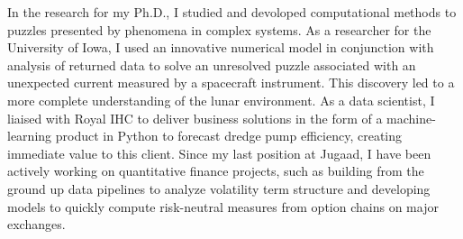 \documentclass[12pt,a4paper,sans]{moderncv} %
\begin{document}
In the research for my Ph.D., I studied and devoloped computational methods to puzzles presented by phenomena in complex systems.    
As a researcher for the University of Iowa, I used an innovative numerical model in conjunction with analysis of returned data to solve an unresolved puzzle associated with an unexpected current measured by a spacecraft instrument.
This discovery led to a more complete understanding of the lunar environment.
As a data scientist, I liaised with Royal IHC to deliver business solutions in the form of a machine-learning product in Python to forecast dredge pump efficiency, creating immediate value to this client.
Since my last position at Jugaad, I have been actively working on quantitative finance projects, such as building from the ground up data pipelines to analyze volatility term structure and developing models to quickly compute risk-neutral measures from option chains on major exchanges.
\vspace{0.25cm}
\end{document}
